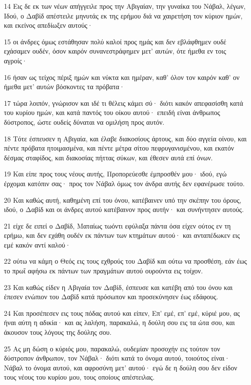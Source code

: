\par 14 Εις δε εκ των νέων απήγγειλε προς την Αβιγαίαν, την γυναίκα του Νάβαλ, λέγων, Ιδού, ο Δαβίδ απέστειλε μηνυτάς εκ της ερήμου διά να χαιρετήση τον κύριον ημών, και εκείνος απεδίωξεν αυτούς·
\par 15 οι άνδρες όμως εστάθησαν πολύ καλοί προς ημάς και δεν εβλάφθημεν ουδέ εχάσαμεν ουδέν, όσον καιρόν συνανεστράφημεν μετ' αυτών, ότε ήμεθα εν τοις αγροίς·
\par 16 ήσαν ως τείχος πέριξ ημών και νύκτα και ημέραν, καθ' όλον τον καιρόν καθ' ον ήμεθα μετ' αυτών βόσκοντες τα πρόβατα·
\par 17 τώρα λοιπόν, γνώρισον και ιδέ τι θέλεις κάμει σύ· διότι κακόν απεφασίσθη κατά του κυρίου ημών, και κατά παντός του οίκου αυτού· επειδή είναι άνθρωπος δύστροπος, ώστε ουδείς δύναται να ομιλήση προς αυτόν.
\par 18 Τότε έσπευσεν η Αβιγαία, και έλαβε διακοσίους άρτους, και δύο αγγεία οίνου, και πέντε πρόβατα ητοιμασμένα, και πέντε μέτρα σίτου πεφρυγανισμένου, και εκατόν δέσμας σταφίδος, και διακοσίας πήττας σύκων, και έθεσεν αυτά επί όνων.
\par 19 Και είπε προς τους νέους αυτής, Προπορεύεσθε έμπροσθέν μου· ιδού, εγώ έρχομαι κατόπιν σας· προς τον Νάβαλ όμως τον άνδρα αυτής δεν εφανέρωσε τούτο.
\par 20 Και καθώς αυτή, καθημένη επί του όνου, κατέβαινεν υπό την σκέπην του όρους, ιδού, ο Δαβίδ και οι άνδρες αυτού κατέβαινον προς αυτήν· και συνήντησεν αυτούς.
\par 21 είχε δε ειπεί ο Δαβίδ, Ματαίως τωόντι εφύλαξα πάντα όσα είχεν ούτος εν τη ερήμω, και δεν εχάθη ουδέν εκ πάντων των κτημάτων αυτού· και ανταπέδωκεν εις εμέ κακόν αντί καλού·
\par 22 ούτω να κάμη ο Θεός εις τους εχθρούς του Δαβίδ και ούτω να προσθέση, εάν έως το πρωΐ αφήσω εκ πάντων των πραγμάτων αυτού ουρούντα εις τοίχον.
\par 23 Και καθώς είδεν η Αβιγαία τον Δαβίδ, έσπευσε και κατέβη από του όνου και έπεσεν ενώπιον του Δαβίδ κατά πρόσωπον και προσεκύνησεν έως εδάφους.
\par 24 Και προσέπεσεν εις τους πόδας αυτού και είπεν, Επ' εμέ, επ' εμέ, κύριέ μου, ας ήναι αύτη η αδικία· και ας λαλήση, παρακαλώ, η δούλη σου εις τα ώτα σου, και άκουσον τους λόγους της δούλης σου.
\par 25 Ας μη δώση ο κύριός μου, παρακαλώ, ουδεμίαν προσοχήν εις τούτον τον δύστροπον άνθρωπον, τον Νάβαλ· διότι κατά το όνομα αυτού, τοιούτος είναι· Νάβαλ το όνομα αυτού, και αφροσύνη μετ' αυτού· εγώ δε η δούλη σου δεν είδον τους νέους του κυρίου μου, τους οποίους απέστειλας.
